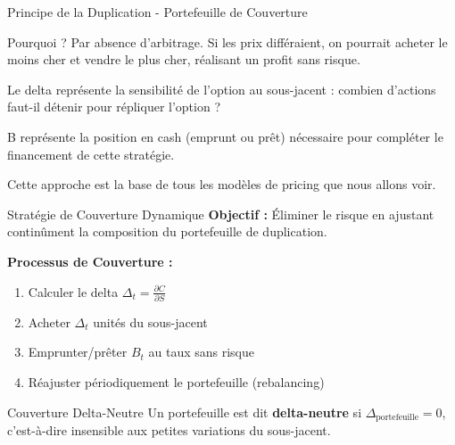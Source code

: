 \documentclass[aspectratio=169, 10pt]{beamer}
\begin{document}
\begin{frame}{Principe de la Duplication - Portefeuille de Couverture}
{        Pourquoi ? Par absence d'arbitrage. Si les prix différaient,
        on pourrait acheter le moins cher et vendre le plus cher,
        réalisant un profit sans risque.
        
        Le delta représente la sensibilité de l'option au sous-jacent :
        combien d'actions faut-il détenir pour répliquer l'option ?
        
        B représente la position en cash (emprunt ou prêt) nécessaire
        pour compléter le financement de cette stratégie.
        
        Cette approche est la base de tous les modèles de pricing que nous allons voir.
    }
\end{frame}

\begin{frame}{Stratégie de Couverture Dynamique}
    \textbf{Objectif :} Éliminer le risque en ajustant continûment la composition du portefeuille de duplication.
    
    \vspace{0.3cm}
    \textbf{Processus de Couverture :}
    \begin{enumerate}
        \item Calculer le delta $\Delta_t = \frac{\partial C}{\partial S}$
        \item Acheter $\Delta_t$ unités du sous-jacent
        \item Emprunter/prêter $B_t$ au taux sans risque
        \item Réajuster périodiquement le portefeuille (rebalancing)
    \end{enumerate}
    
    \vspace{0.3cm}
    \begin{block}{Couverture Delta-Neutre}
    Un portefeuille est dit \textbf{delta-neutre} si $\Delta_{\text{portefeuille}} = 0$, c'est-à-dire insensible aux petites variations du sous-jacent.
    \end{block}
\end{frame}
\end{document}
